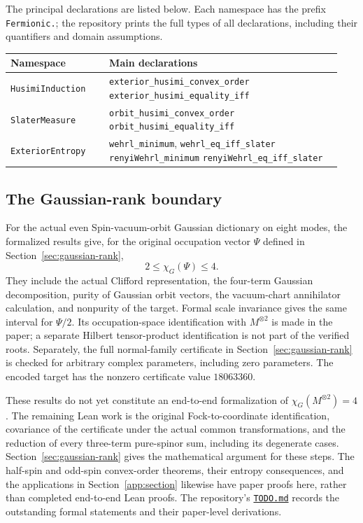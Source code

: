 The principal declarations are listed below. Each namespace has the prefix
\texttt{Fermionic.}; the repository prints the full types of all declarations,
including their quantifiers and domain assumptions.
\begin{center}
\small
\begin{tabular}{@{}p{0.28\linewidth}p{0.66\linewidth}@{}}
\toprule
Namespace & Main declarations \\
\midrule
\texttt{HusimiInduction} &
\texttt{exterior\_husimi\_convex\_order}\newline
\texttt{exterior\_husimi\_equality\_iff} \\[3pt]
\texttt{SlaterMeasure} &
\texttt{orbit\_husimi\_convex\_order}\newline
\texttt{orbit\_husimi\_equality\_iff} \\[3pt]
\texttt{ExteriorEntropy} &
\texttt{wehrl\_minimum}, \texttt{wehrl\_eq\_iff\_slater}\newline
\texttt{renyiWehrl\_minimum}\newline
\texttt{renyiWehrl\_eq\_iff\_slater} \\
\bottomrule
\end{tabular}
\end{center}

\subsection{The Gaussian-rank boundary}

For the actual even Spin-vacuum-orbit Gaussian dictionary on eight modes,
the formalized results give, for the original occupation vector $\Psi$
defined in Section~\ref{sec:gaussian-rank},
\[
 2\le\chi_G(\Psi)\le4.
\]
They include the actual Clifford representation, the four-term Gaussian
decomposition, purity of Gaussian orbit vectors, the vacuum-chart
annihilator calculation, and nonpurity of the target. Formal scale
invariance gives the same interval for $\Psi/2$. Its occupation-space
identification with $M^{\otimes2}$ is made in the paper; a separate
Hilbert tensor-product identification is not part of the verified roots.
Separately, the full
normal-family certificate in Section~\ref{sec:gaussian-rank} is checked for
arbitrary complex parameters, including zero parameters. The encoded
target has the nonzero certificate value $18063360$.

These results do not yet constitute an end-to-end formalization of
$\chi_G(M^{\otimes2})=4$. The remaining Lean work is the original
Fock-to-coordinate identification, covariance of the certificate under the
actual common transformations, and the reduction of every three-term
pure-spinor sum, including its degenerate cases. Section~\ref{sec:gaussian-rank}
gives the mathematical argument for these steps. The half-spin and odd-spin
convex-order theorems, their entropy consequences, and the applications in
Section~\ref{app:section} likewise have paper proofs here, rather than
completed end-to-end Lean proofs. The repository's
\href{https://github.com/veridiscoverLab/fermionic-coherent-lean/blob/main/TODO.md}{\texttt{TODO.md}}
records the outstanding formal statements and their paper-level derivations.

